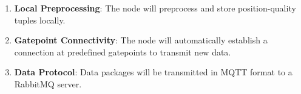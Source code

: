 \begin{enumerate}
\begin{enumerate}
          \item \textbf{Local Preprocessing}: The node will preprocess and store position-quality tuples locally.
          \item \textbf{Gatepoint Connectivity}: The node will automatically establish a connection at predefined gatepoints to transmit new data.
          \item \textbf{Data Protocol}: Data packages will be transmitted in MQTT format to a RabbitMQ server.
      \end{enumerate}
    \end{enumerate}